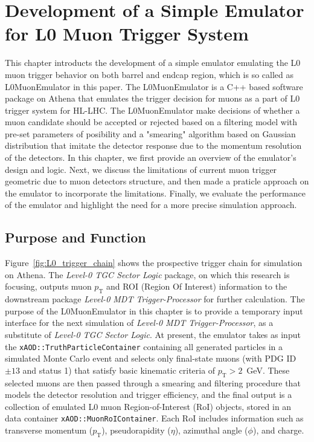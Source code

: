 \chapter{Development of a Simple Emulator for L0 Muon Trigger System} \label{ch:L0MuonEmulator}
This chapter introducts the development of a simple emulator emulating the L0 muon trigger behavior on both barrel and endcap region, which is so called as L0MuonEmulator in this paper. The L0MuonEmulator is a C++ based software package on Athena that emulates the trigger decision for muons as a part of L0 trigger system for HL-LHC. The L0MuonEmulator make decisions of whether a muon candidate should be accepted or rejected based on a filtering model with pre-set parameters of posibility and a "smearing" algorithm based on Gaussian distribution that imitate the detector response due to the momentum resolution of the detectors. In this chapter, we first provide an overview of the emulator's design and logic. Next, we discuss the limitations of current muon trigger geometric due to muon detectors structure, and then made a praticle approach on the emulator to incorporate the limitations. Finally, we evaluate the performance of the emulator and highlight the need for a more precise simulation approach.
\section{Purpose and Function} \label{sec:L0MuonPurpose}
Figure~\ref{fig:L0_trigger_chain} shows the prospective trigger chain for simulation on Athena. The \textit{Level-0 TGC Sector Logic} package, on which this research is focusing, outputs muon $p_\mathrm{T}$ and ROI (Region Of Interest) information to the downstream package \textit{Level-0 MDT Trigger-Processor} for further calculation. The purpose of the L0MuonEmulator in this chapter is to provide a temporary input interface for the next simulation of \textit{Level-0 MDT Trigger-Processor}, as a substitute of \textit{Level-0 TGC Sector Logic}. At present, the emulator takes as input the \texttt{xAOD::TruthParticleContainer} containing all generated particles in a simulated Monte Carlo event and selects only final-state muons (with PDG ID $\pm13$ and status 1) that satisfy basic kinematic criteria of $p_\mathrm{T} > 2$~GeV. These selected muons are then passed through a smearing and filtering procedure that models the detector resolution and trigger efficiency, and the final output is a collection of emulated L0 muon Region-of-Interest (RoI) objects, stored in an data container \texttt{xAOD::MuonRoIContainer}. Each RoI includes information such as transverse momentum ($p_\mathrm{T}$), pseudorapidity ($\eta$), azimuthal angle ($\phi$), and charge.

